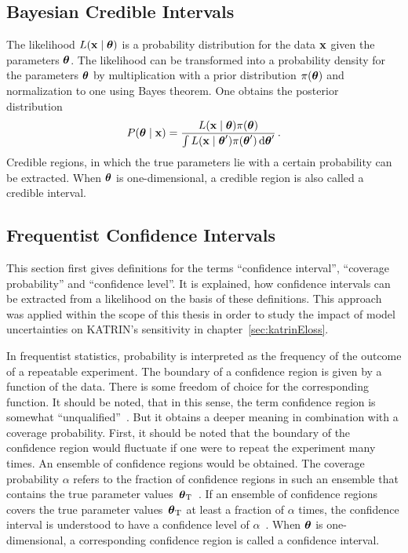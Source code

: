 \subsection{Bayesian Credible Intervals}
\label{sec:statMethodsUncertaintyIntervalsCredible}
The likelihood $L\giventhat{\dataVec}{\paramVec}$ is a probability distribution for the data $\boldsymbol{\mathbf{x}}$ given the parameters $\boldsymbol{\mathbf{\theta}}$. The likelihood can be transformed into a probability density for the parameters $\boldsymbol{\mathbf{\theta}}$ by multiplication with a prior distribution $\pi(\boldsymbol{\mathbf{\theta}})$ and normalization to one using Bayes theorem. One obtains the posterior distribution~\cite{ReviewOfParticlePhysics}
\begin{equation}
\label{eq:statMethodsPosterior}
	P\giventhat{\paramVec}{\dataVec} = 
		\frac{
			L\giventhat{\dataVec}{\paramVec}\pi(\paramVec)
		}{
			\int L\giventhat{\dataVec}{\paramVec^\prime}\pi(\paramVec^\prime) \d\paramVec^\prime
		}
	\fullstop
\end{equation}
Credible regions, in which the true parameters lie with a certain probability can be extracted. When $\boldsymbol{\mathbf{\theta}}$ is one-dimensional, a credible region is also called a credible interval. 

\subsection{Frequentist Confidence Intervals}
\label{sec:statMethodsUncertaintyIntervalsConfidence}
This section first gives definitions for the terms ``confidence interval'', ``coverage probability'' and ``confidence level''. It is explained, how confidence intervals can be extracted from a likelihood on the basis of these definitions. This approach was applied within the scope of this thesis in order to study the impact of model uncertainties on KATRIN's sensitivity in chapter~\ref{sec:katrinEloss}.

In frequentist statistics, probability is interpreted as the frequency of the outcome of a repeatable experiment. The boundary of a confidence region is given by a function of the data. There is some freedom of choice for the corresponding function. It should be noted, that in this sense, the term confidence region is somewhat ``unqualified''~\cite{ReviewOfParticlePhysics}. But it obtains a deeper meaning in combination with a coverage probability. First, it should be noted that the boundary of the confidence region would fluctuate if one were to repeat the experiment many times. An ensemble of confidence regions would be obtained. The coverage probability $\alpha$ refers to the fraction of confidence regions in such an ensemble that contains the true parameter values~$\boldsymbol{\mathbf{\theta}}_\mathrm{T}$~\cite{ReviewOfParticlePhysics}. If an ensemble of confidence regions covers the true parameter values~$\boldsymbol{\mathbf{\theta}}_\mathrm{T}$ at least a fraction of $\alpha$ times, the confidence interval is understood to have a confidence level of $\alpha$~\cite{ReviewOfParticlePhysics}. When $\boldsymbol{\mathbf{\theta}}$ is one-dimensional, a corresponding confidence region is called a confidence interval. 


